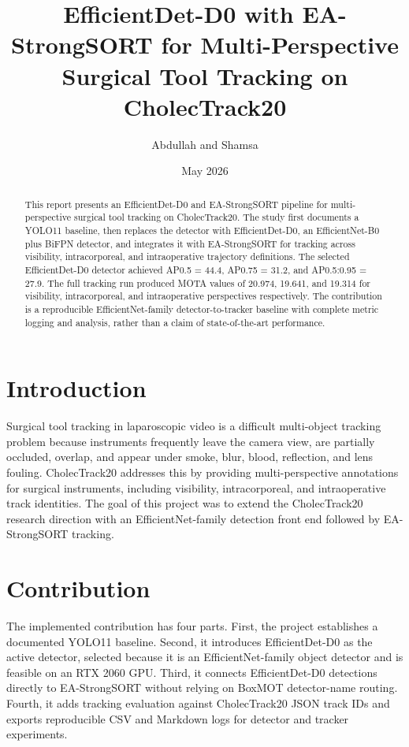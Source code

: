 \documentclass[12pt,a4paper]{report}
\title{EfficientDet-D0 with EA-StrongSORT for Multi-Perspective Surgical Tool Tracking on CholecTrack20}
\author{Abdullah and Shamsa}
\date{May 2026}
\begin{document}
        \maketitle
        \tableofcontents
        \clearpage
        \begin{abstract}
This report presents an EfficientDet-D0 and EA-StrongSORT pipeline for multi-perspective surgical tool tracking on CholecTrack20. The study first documents a YOLO11 baseline, then replaces the detector with EfficientDet-D0, an EfficientNet-B0 plus BiFPN detector, and integrates it with EA-StrongSORT for tracking across visibility, intracorporeal, and intraoperative trajectory definitions. The selected EfficientDet-D0 detector achieved AP0.5 = 44.4, AP0.75 = 31.2, and AP0.5:0.95 = 27.9. The full tracking run produced MOTA values of 20.974, 19.641, and 19.314 for visibility, intracorporeal, and intraoperative perspectives respectively. The contribution is a reproducible EfficientNet-family detector-to-tracker baseline with complete metric logging and analysis, rather than a claim of state-of-the-art performance.
\end{abstract}
\section{Introduction}
Surgical tool tracking in laparoscopic video is a difficult multi-object tracking problem because instruments frequently leave the camera view, are partially occluded, overlap, and appear under smoke, blur, blood, reflection, and lens fouling. CholecTrack20 addresses this by providing multi-perspective annotations for surgical instruments, including visibility, intracorporeal, and intraoperative track identities. The goal of this project was to extend the CholecTrack20 research direction with an EfficientNet-family detection front end followed by EA-StrongSORT tracking.
\section{Contribution}
The implemented contribution has four parts. First, the project establishes a documented YOLO11 baseline. Second, it introduces EfficientDet-D0 as the active detector, selected because it is an EfficientNet-family object detector and is feasible on an RTX 2060 GPU. Third, it connects EfficientDet-D0 detections directly to EA-StrongSORT without relying on BoxMOT detector-name routing. Fourth, it adds tracking evaluation against CholecTrack20 JSON track IDs and exports reproducible CSV and Markdown logs for detector and tracker experiments.
\end{document}
